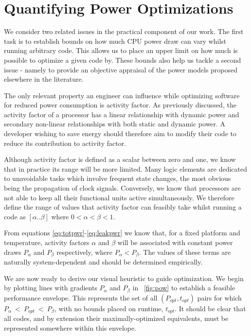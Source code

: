 \section{Quantifying Power Optimizations}
\label{sec:quantifying}

We consider two related issues in the practical component of our work. The first task is to establish bounds on how much CPU power draw can vary whilst running arbitrary code. This allows us to place an upper limit on how much is possible to optimize a given code by. These bounds also help us tackle a second issue - namely to provide an objective appraisal of the power models proposed elsewhere in the literature.

The only relevant property an engineer can influence while optimizing software for reduced power consumption is activity factor. As previously discussed, the activity factor of a processor has a linear relationship with dynamic power and secondary non-linear relationships with both static and dynamic power. A developer wishing to save energy should therefore aim to modify their code to reduce its contribution to activity factor.

Although activity factor is defined as a scalar between zero and one, we know that in practice its range will be more limited. Many logic elements are dedicated to unavoidable tasks which involve frequent state changes, the most obvious being the propagation of clock signals. Conversely, we know that processors are not able to keep all their functional units active simultaneously. We therefore define the range of values that activity factor can feasibly take whilst running a code as $[\alpha  .. \beta]$ where $0 < \alpha < \beta < 1$.

From equations \ref{eq:totpwr}-\ref{eq:leakpwr} we know that, for a fixed platform and temperature, activity factors $\alpha$ and $\beta$ will be associated with constant power draws $P_{\alpha}$ and $P_{\beta}$ respectively, where $P_{\alpha} < P_{\beta}$. The values of these terms are naturally system-dependent and should be determined empirically. 

We are now ready to derive our visual heuristic to guide optimization. We begin by plotting lines with gradients $P_{\alpha}$ and $P_{\beta}$ in \figurename~\ref{fig:pow} to establish a feasible performance envelope. This represents the set of all $(P_{opt}, t_{opt})$ pairs for which $P_{\alpha}~<~P_{opt}~<~P_{\beta}$, with no bounds placed on runtime, $t_{opt}$. It should be clear that all codes,  and by extension their maximally-optimized equivalents, must be represented somewhere within this envelope.

